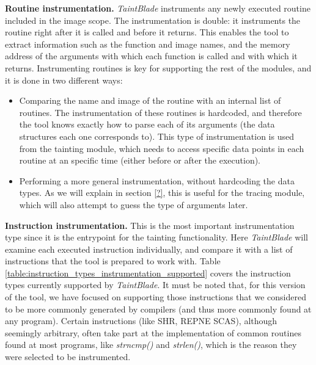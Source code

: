 \documentclass[conference]{IEEEtran}
\begin{document}
\textbf{Routine instrumentation.}
\textit{TaintBlade} instruments any newly executed routine included in the image scope. The instrumentation is double: it instruments
the routine right after it is called and before it returns. This enables
the tool to extract information such as the function and image names, and the memory address of the arguments with which each
function is called and with which it returns. Instrumenting routines is key for supporting the rest of the modules, and it is done in two different ways:

\begin{itemize}
    \item Comparing the name and image of the routine with an internal list of routines.
          The instrumentation of these routines is hardcoded, and therefore the tool
          knows exactly how to parse each of its arguments (the data structures each one
          corresponds to). This type of instrumentation is used from the tainting module,
          which needs to access specific data points in each routine at an specific time
          (either before or after the execution).
    \item Performing a more general instrumentation, without hardcoding the data types.
          As we will explain in section \ref{?}, this is useful for the tracing module,
          which will also attempt to guess the type of arguments later.
\end{itemize}

\textbf{Instruction instrumentation.}
This is the most important instrumentation type since it is the entrypoint for the tainting functionality.
Here \textit{TaintBlade} will examine each executed instruction individually, and
compare it with a list of instructions that the tool is prepared to work with. Table \ref{table:instruction_types_instrumentation_supported}
covers the instruction types currently supported by \textit{TaintBlade}. It must be noted that, for this version of the tool, we have focused
on supporting those instructions that we considered to be more commonly generated by compilers (and thus
more commonly found at any program). Certain instructions (like SHR, REPNE SCAS), although seemingly arbitrary,
often take part at the implementation of common routines found at most programs, like \textit{strncmp()} and \textit{strlen()},
which is the reason they were selected to be instrumented.
\end{document}
